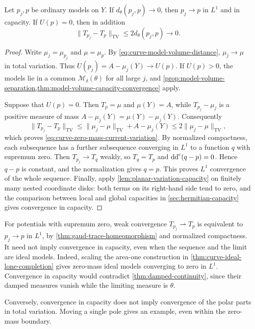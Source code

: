 \begin{theorem}\label{thm:curve-model-capacity-convergence}
Let $p_j,p$ be ordinary models on $Y$. If $d_\theta(p_j,p)\to0$, then $p_j\to p$ in $L^1$ and in capacity. If $U(p)=0$, then in addition
\begin{equation}\label{eq:curve-zero-mass-current-variation}
 \|T_{p_j}-T_p\|_{\mathrm{TV}}\leq2d_\theta(p_j,p)\longrightarrow0.
\end{equation}
\end{theorem}
\begin{proof}
Write $\mu_j=\mu_{p_j}$ and $\mu=\mu_p$. By \eqref{eq:curve-model-volume-distance}, $\mu_j\to\mu$ in total variation. Thus $U(p_j)=A-\mu_j(Y)\to U(p)$. If $U(p)>0$, the models lie in a common $\mathcal M_\delta(\theta)$ for all large $j$, and \cref{prop:model-volume-separation,thm:model-volume-capacity-convergence} apply.

Suppose that $U(p)=0$. Then $T_p=\mu$ and $\mu(Y)=A$, while $T_{p_j}-\mu_j$ is a positive measure of mass $A-\mu_j(Y)=\mu(Y)-\mu_j(Y)$. Consequently
\[
 \|T_{p_j}-T_p\|_{\mathrm{TV}}
 \leq\|\mu_j-\mu\|_{\mathrm{TV}}+A-\mu_j(Y)
 \leq2\|\mu_j-\mu\|_{\mathrm{TV}},
\]
which proves \eqref{eq:curve-zero-mass-current-variation}. By normalized compactness, each subsequence has a further subsequence converging in $L^1$ to a function $q$ with supremum zero. Then $T_{p_j}\to T_q$ weakly, so $T_q=T_p$ and $\mathrm{dd}^{\mathrm{c}}(q-p)=0$. Hence $q-p$ is constant, and the normalization gives $q=p$. This proves $L^1$ convergence of the whole sequence. Finally, apply \cref{lem:planar-variation-capacity} on finitely many nested coordinate disks: both terms on its right-hand side tend to zero, and the comparison between local and global capacities in \cref{sec:hermitian-capacity} gives convergence in capacity.
\end{proof}

For potentials with supremum zero, weak convergence $T_{p_j}\rightharpoonup T_p$ is equivalent to $p_j\to p$ in $L^1$, by \cref{thm:gaud-trace-homeomorphism} and normalized compactness. It need not imply convergence in capacity, even when the sequence and the limit are ideal models. Indeed, scaling the area-one construction in \cref{thm:curve-ideal-lone-completion} gives zero-mass ideal models converging to zero in $L^1$. Convergence in capacity would contradict \cref{thm:damped-continuity}, since their damped measures vanish while the limiting measure is $\theta$.

Conversely, convergence in capacity does not imply convergence of the polar parts in total variation. Moving a single pole gives an example, even within the zero-mass boundary.

